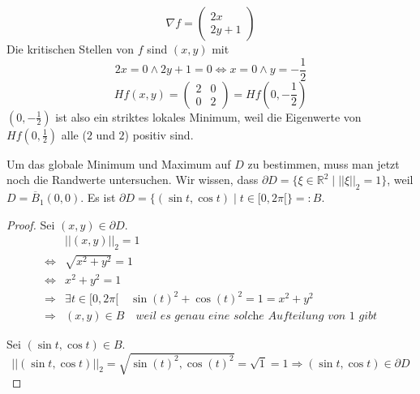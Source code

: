 \documentclass[10pt,a4paper]{article}
\begin{document}
\begin{equation}
\nabla f = \begin{pmatrix}
2x\\
2y + 1
\end{pmatrix}
\end{equation}
Die kritischen Stellen von $f$ sind $(x, y)$ mit
\begin{equation}
2x = 0 \land 2y + 1 = 0 \Leftrightarrow x = 0 \land y = -\frac{1}{2}
\end{equation}
\begin{equation}
Hf(x, y) = \begin{pmatrix}
2 & 0\\
0 & 2
\end{pmatrix} = Hf(0, -\frac{1}{2})
\end{equation}
$(0, -\frac{1}{2})$ ist also ein striktes lokales Minimum, weil die Eigenwerte von $Hf(0, \frac{1}{2})$ alle ($2$ und $2$) positiv sind.

Um das globale Minimum und Maximum auf $D$ zu bestimmen, muss man jetzt noch die Randwerte untersuchen.
Wir wissen, dass $\partial D = \{ \xi \in \mathbb{R}^{2} \mid ||\xi||_{2} = 1 \}$, weil $D = \overline{B}_{1}(0, 0)$.
Es ist $\partial D = \{ (\sin t, \cos t) \mid t \in [0, 2\pi[ \} =: B$.

\begin{proof}
Sei $(x, y) \in \partial D$.
\begin{align*}
& ||(x, y)||_{2} = 1\\
\Leftrightarrow & \sqrt{x^{2} + y^{2}} = 1\\
\Leftrightarrow & x^{2} + y^{2} = 1\\
\Rightarrow & \exists t \in [0, 2\pi[ \quad \sin(t)^{2} + \cos(t)^{2} = 1 = x^{2} + y^{2}\\
\Rightarrow & (x, y) \in B \quad \textit{weil es genau eine solche Aufteilung von $1$ gibt}
\end{align*}

Sei $(\sin t, \cos t) \in B$.
\begin{equation}
||(\sin t, \cos t)||_{2} = \sqrt{\sin(t)^{2}, \cos(t)^{2}} = \sqrt{1} = 1 \Rightarrow (\sin t, \cos t) \in \partial D
\end{equation}
\end{proof}
\end{document}
